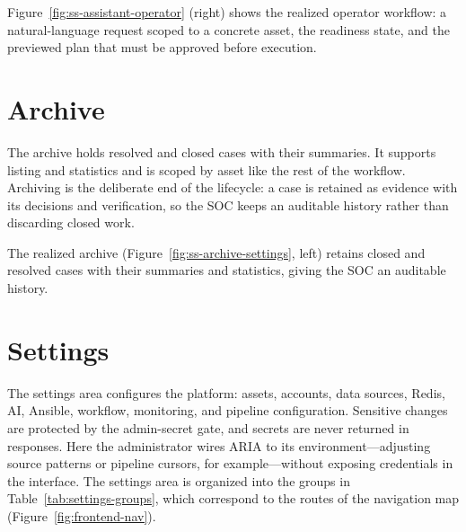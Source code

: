 Figure~\ref{fig:ss-assistant-operator} (right) shows the realized operator workflow: a natural-language request scoped to a concrete asset, the readiness state, and the previewed plan that must be approved before execution.


\section{Archive}

The archive holds resolved and closed cases with their summaries. It supports listing and statistics and is scoped by asset like the rest of the workflow. Archiving is the deliberate end of the lifecycle: a case is retained as evidence with its decisions and verification, so the SOC keeps an auditable history rather than discarding closed work.

The realized archive (Figure~\ref{fig:ss-archive-settings}, left) retains closed and resolved cases with their summaries and statistics, giving the SOC an auditable history.

\section{Settings}

The settings area configures the platform: assets, accounts, data sources, Redis, AI, Ansible, workflow, monitoring, and pipeline configuration. Sensitive changes are protected by the admin-secret gate, and secrets are never returned in responses. Here the administrator wires ARIA to its environment---adjusting source patterns or pipeline cursors, for example---without exposing credentials in the interface. The settings area is organized into the groups in Table~\ref{tab:settings-groups}, which correspond to the  routes of the navigation map (Figure~\ref{fig:frontend-nav}).

